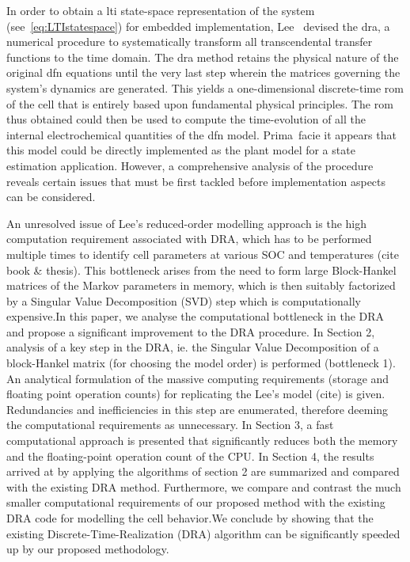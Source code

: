 In  order  to  obtain  a  \gls{lti} state-space  representation  of  the  system
(see~\cref{eq:LTIstatespace}) for  embedded implementation,  Lee~\etal{} devised
the   \gls{dra},  a   numerical  procedure   to  systematically   transform  all
transcendental  transfer functions  to  the time  domain.  The \gls{dra}  method
retains  the physical  nature  of  the original  \gls{dfn}  equations until  the
very  last  step  wherein  the  matrices governing  the  system's  dynamics  are
generated. This  yields a  one-dimensional discrete-time  \gls{rom} of  the cell
that is entirely based upon  fundamental physical principles. The \gls{rom} thus
obtained could  then be used to  compute the time-evolution of  all the internal
electrochemical quantities of  the \gls{dfn} model. Prima~facie  it appears that
this  model  could be  directly  implemented  as the  plant  model  for a  state
estimation  application.  However, a  comprehensive  analysis  of the  procedure
reveals certain issues that must  be first tackled before implementation aspects
can be considered.


An unresolved issue of Lee\textquoteright  s reduced-order modelling approach is
the high computation requirement associated with  DRA, which has to be performed
multiple  times to  identify cell  parameters  at various  SOC and  temperatures
(cite  book \&  thesis). This  bottleneck  arises from  the need  to form  large
Block-Hankel matrices of the Markov parameters in memory, which is then suitably
factorized by a Singular Value Decomposition (SVD) step which is computationally
expensive.In this paper, we analyse the  computational bottleneck in the DRA and
propose a significant  improvement to the DRA procedure. In  Section 2, analysis
of a key step in the DRA, ie. the Singular Value Decomposition of a block-Hankel
matrix (for choosing the model order) is performed (bottleneck 1). An analytical
formulation of  the massive computing  requirements (storage and  floating point
operation  counts) for  replicating  the Lee\textquoteright  s  model (cite)  is
given. Redundancies  and inefficiencies in  this step are  enumerated, therefore
deeming  the computational  requirements as  unnecessary. In  Section 3,  a fast
computational approach is  presented that significantly reduces  both the memory
and the  floating-point operation count  of the CPU.  In Section 4,  the results
arrived at by  applying the algorithms of section 2  are summarized and compared
with the  existing DRA  method. Furthermore,  we compare  and contrast  the much
smaller computational requirements of our  proposed method with the existing DRA
code for  modelling the cell behavior.We  conclude by showing that  the existing
Discrete-Time-Realization (DRA) algorithm can be significantly speeded up by our
proposed methodology.

